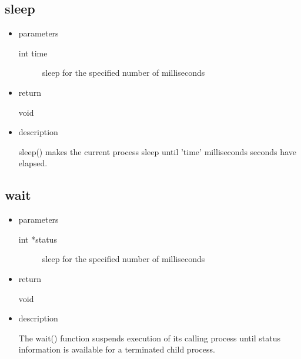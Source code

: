 \subsection{sleep}
\begin{itemize}
\item{parameters}
\begin{description}
	\item[int time] sleep for the specified number of milliseconds
\end{description}
\item{return}
\begin{description}
	\item[void]
\end{description}
\item{description}

sleep()  makes  the  current  process  sleep until 'time' milliseconds seconds have
elapsed.
\end{itemize}

\subsection{wait}
\begin{itemize}
\item{parameters}
\begin{description}
	\item[int *status] sleep for the specified number of milliseconds
\end{description}
\item{return}
\begin{description}
	\item[void]
\end{description}
\item{description}

The wait() function suspends execution of its calling process until
status information is available for a terminated child process.
\end{itemize}

